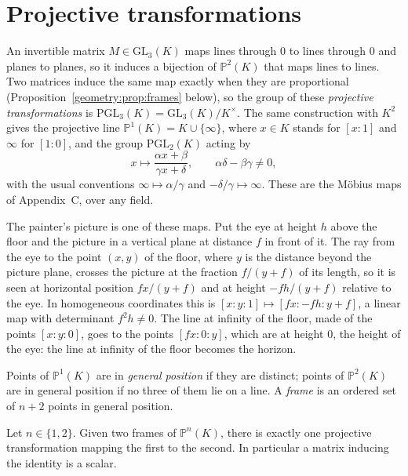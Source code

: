 \section{Projective transformations}

An invertible matrix $M\in\mathrm{GL}_3(K)$ maps lines through $0$ to lines through $0$ and planes to planes, so it induces a bijection of
$\mathbb P^2(K)$ that maps lines to lines. Two matrices induce the same map exactly when they are proportional (Proposition~\ref{geometry:prop:frames}
below), so the group of these \emph{projective transformations} is $\mathrm{PGL}_3(K)=\mathrm{GL}_3(K)/K^\times$. The same construction with
$K^2$ gives the projective line $\mathbb P^1(K)=K\cup\{\infty\}$, where $x\in K$ stands for $[x:1]$ and $\infty$ for $[1:0]$, and the group
$\mathrm{PGL}_2(K)$ acting by
\[
x\longmapsto \frac{\alpha x+\beta}{\gamma x+\delta},\qquad \alpha\delta-\beta\gamma\ne0,
\]
with the usual conventions $\infty\mapsto\alpha/\gamma$ and $-\delta/\gamma\mapsto\infty$. These are the M\"obius maps of Appendix~C, over any
field.

The painter's picture is one of these maps. Put the eye at height $h$ above the floor and the picture in a vertical plane at distance $f$ in front
of it. The ray from the eye to the point $(x,y)$ of the floor, where $y$ is the distance beyond the picture plane, crosses the picture at the
fraction $f/(y+f)$ of its length, so it is seen at horizontal position $fx/(y+f)$ and at height $-fh/(y+f)$ relative to the eye. In homogeneous
coordinates this is $[x:y:1]\mapsto[fx:-fh:y+f]$, a linear map with determinant $f^2h\ne0$. The line at infinity of the floor, made of the points
$[x:y:0]$, goes to the points $[fx:0:y]$, which are at height $0$, the height of the eye: the line at infinity of the floor becomes the horizon.

\begin{definition}
Points of $\mathbb P^1(K)$ are in \emph{general position} if they are distinct; points of $\mathbb P^2(K)$ are in general position if no three
of them lie on a line.
A \emph{frame} is an ordered set of $n+2$ points in general position.
\end{definition}

\begin{proposition}[Frames]\label{geometry:prop:frames}
Let $n\in\{1,2\}$. Given two frames of $\mathbb P^n(K)$, there is exactly one projective transformation mapping the first to the second.
In particular a matrix inducing the identity is a scalar.
\end{proposition}

